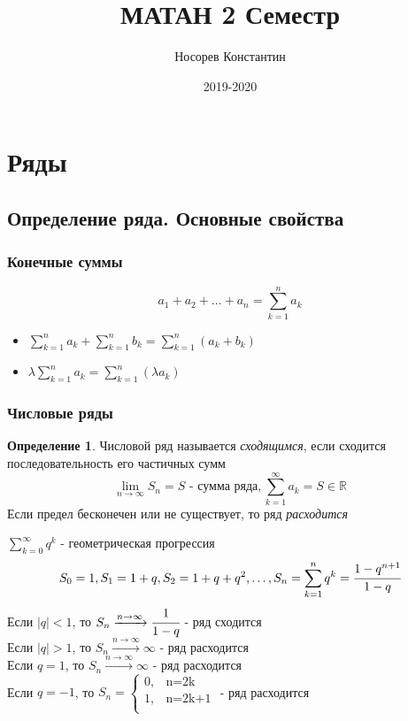 \documentclass[a4paper]{article}
\title{ МАТАН 2 Семестр}
\author{Носорев Константин}
\date{2019-2020\\}
\theoremstyle{definition}
\newtheorem{definition}{Определение}
\newcommand\abs[1]{%
\mbox{$| #1 |$}}
\numberwithin{theorem}{subsection}
\numberwithin{lemma}{subsection}
\numberwithin{definition}{subsection}
\numberwithin{comment*}{subsection}
\numberwithin{consequence}{subsection}
\numberwithin{property}{subsection}
\begin{document}
\maketitle
\tableofcontents
\newpage
\section{Ряды}
\subsection{Определение ряда. Основные свойства}
\setcounter{subsubsection}{-1}

\subsubsection{Конечные суммы}
$$a_1+a_2+\dots+a_n = \sum_{k=1}^{n} a_k$$
\begin{itemize}
 \item $\sum_{k=1}^{n}{a_k} + \sum_{k=1}^{n}{b_k} = \sum_{k=1}^{n}{(a_k+b_k)}$
 \item $\lambda \sum_{k=1}^{n}{a_k} = \sum_{k=1}^{n}{(\lambda a_k)}$
\end{itemize}
\subsubsection{Числовые ряды}
\begin{definition}
 Числовой ряд называется \textit{сходящимся}, если сходится последовательность его частичных сумм
 $$\lim_{n\rightarrow \infty}{S_n}=S \text{ - сумма ряда}, \sum_{k=1}^{\infty}{a_k} = S \in \mathbb{R} $$
 Если предел бесконечен или не существует, то ряд \textit{расходится}
\end{definition}
\exmp $\sum_{k=0}^{\infty}{q^k} \text{ - геометрическая прогрессия }$
$$S_0 = 1, S_1 = 1+q, S_2= 1 + q +q^2, \dots , S_n = \sum_{k=1}^{n}{q^k} = \cfrac{1-q^{n+1}}{1-q}$$
Если $\abs{q} < 1$, то $S_n \xrightarrow{n\rightarrow \infty} \cfrac{1}{1-q}$ - ряд сходится\\
Если $\abs{q} > 1$, то $S_n \xrightarrow{n\rightarrow \infty} \infty$ - ряд расходится\\
Если $q = 1$, то $S_n \xrightarrow{n\rightarrow \infty} \infty$ - ряд расходится\\
Если $q = -1$, то $S_n = \begin{cases}
  0, & \text{n=2k}   \\
  1, & \text{n=2k+1} \\
 \end{cases}$ - ряд расходится
\end{document}
